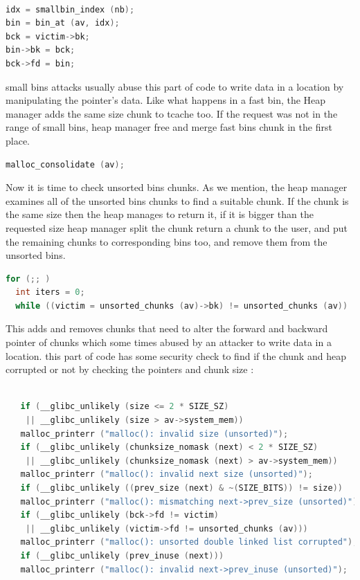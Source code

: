 \documentclass{masterthesis}
\newcommand*\tch{tcache}
\newcommand*\fb{fast bins}
\newcommand*\ub{unsorted bins}
\newcommand*\sbs{small bins}
\begin{document}
\begin{lstlisting}[language=c,frame=tlrb]

idx = smallbin_index (nb);
bin = bin_at (av, idx);
bck = victim->bk;
bin->bk = bck;
bck->fd = bin;
\end{lstlisting}

\sbs{} attacks usually abuse this part of code to write data in a location by manipulating the pointer's data. Like what happens in a fast bin, the Heap manager adds the same size chunk to \tch{} too. If the request was not in the range of \sbs{}, heap manager free and merge \fb{} chunk in the first place.
\begin{lstlisting}[language=c,frame=tlrb]
malloc_consolidate (av);
\end{lstlisting}

Now it is time to check \ub{} chunks. As we mention, the heap manager examines all of the \ub{} chunks to find a suitable chunk. If the chunk is the same size then the heap manages to return it, if it is bigger than the requested size heap manager split the chunk return a chunk to the user, and put the remaining chunks to corresponding bins too, and remove them from the \ub{}.
\begin{lstlisting}[language=c]
for (;; )  
  int iters = 0;
  while ((victim = unsorted_chunks (av)->bk) != unsorted_chunks (av))
\end{lstlisting}
This adds and removes chunks that need to alter the forward and backward pointer of chunks which some times abused by an attacker to write data in a location. this part of code has some security check to find if the chunk and heap corrupted or not by checking the pointers and chunk size :
\begin{lstlisting}[language=c,frame=tlrb]

   if (__glibc_unlikely (size <= 2 * SIZE_SZ)
    || __glibc_unlikely (size > av->system_mem))
   malloc_printerr ("malloc(): invalid size (unsorted)");
   if (__glibc_unlikely (chunksize_nomask (next) < 2 * SIZE_SZ)
    || __glibc_unlikely (chunksize_nomask (next) > av->system_mem))
   malloc_printerr ("malloc(): invalid next size (unsorted)");
   if (__glibc_unlikely ((prev_size (next) & ~(SIZE_BITS)) != size))
   malloc_printerr ("malloc(): mismatching next->prev_size (unsorted)");
   if (__glibc_unlikely (bck->fd != victim)
    || __glibc_unlikely (victim->fd != unsorted_chunks (av)))
   malloc_printerr ("malloc(): unsorted double linked list corrupted");
   if (__glibc_unlikely (prev_inuse (next)))
   malloc_printerr ("malloc(): invalid next->prev_inuse (unsorted)");
\end{lstlisting}
\end{document}
